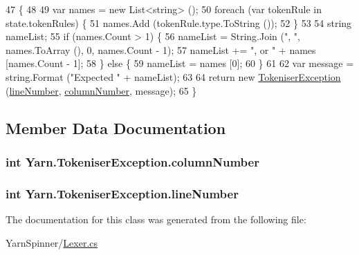 \begin{DoxyCode}
47                                                                                                            
                       \{
48 
49             var names = \textcolor{keyword}{new} List<string> ();
50             \textcolor{keywordflow}{foreach} (var tokenRule \textcolor{keywordflow}{in} state.tokenRules) \{
51                 names.Add (tokenRule.type.ToString ());
52             \}
53 
54             \textcolor{keywordtype}{string} nameList;
55             \textcolor{keywordflow}{if} (names.Count > 1) \{
56                 nameList = String.Join (\textcolor{stringliteral}{", "}, names.ToArray (), 0, names.Count - 1);
57                 nameList += \textcolor{stringliteral}{", or "} + names [names.Count - 1];
58             \} \textcolor{keywordflow}{else} \{
59                 nameList = names [0];
60             \}
61 
62             var message = string.Format (\textcolor{stringliteral}{"Expected "} + nameList);
63             
64             \textcolor{keywordflow}{return} \textcolor{keyword}{new} \hyperlink{a00080_ad00fcf742d2b0d476ce43b27a3f3b6c1}{TokeniserException} (\hyperlink{a00080_a54b936d7b4f26f88a07a66c5fc1d1ad1}{lineNumber}, 
      \hyperlink{a00080_aabf2ad38f3984297c1daede9be55e3d6}{columnNumber}, message);
65         \}
\end{DoxyCode}


\subsection{Member Data Documentation}
\hypertarget{a00080_aabf2ad38f3984297c1daede9be55e3d6}{
\subsubsection[{column\-Number}]{\setlength{\rightskip}{0pt plus 5cm}int Yarn.\-Tokeniser\-Exception.\-column\-Number}}\label{a00080_aabf2ad38f3984297c1daede9be55e3d6}
\hypertarget{a00080_a54b936d7b4f26f88a07a66c5fc1d1ad1}{
\subsubsection[{line\-Number}]{\setlength{\rightskip}{0pt plus 5cm}int Yarn.\-Tokeniser\-Exception.\-line\-Number}}\label{a00080_a54b936d7b4f26f88a07a66c5fc1d1ad1}


The documentation for this class was generated from the following file\-:\begin{DoxyCompactItemize}
\item 
Yarn\-Spinner/\hyperlink{a00119}{Lexer.\-cs}\end{DoxyCompactItemize}
